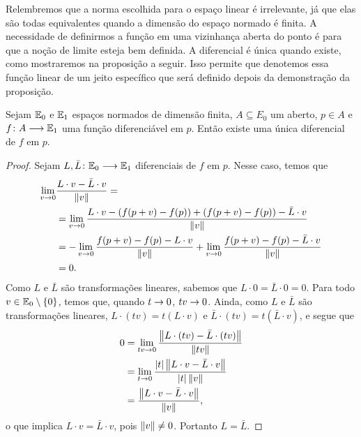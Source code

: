 
Relembremos que a norma escolhida para o espaço linear é irrelevante, já que elas são todas equivalentes quando a dimensão do espaço normado é finita. A necessidade de definirmos a função em uma vizinhança aberta do ponto é para que a noção de limite esteja bem definida. %
A diferencial é única quando existe, como mostraremos na proposição a seguir. Isso permite que denotemos essa função linear de um jeito específico que será definido depois da demonstração da proposição.

\begin{prop}
Sejam $\mathbb{E}_0$ e $\mathbb{E}_1$ espaços normados de dimensão finita, $A \subseteq E_0$ um aberto, $p \in A$ e $f\colon A \longrightarrow \mathbb{E}_1$ uma função diferenciável em $p$. Então existe uma única diferencial de $f$ em $p$.
\end{prop}
\begin{proof}
Sejam $L,\bar L\colon \mathbb{E}_0 \longrightarrow \mathbb{E}_1$ diferenciais de $f$ em $p$. Nesse caso, temos que
	\begin{align*}
	\lim_{v \rightarrow 0} &\frac{L \cdot v - \bar L \cdot v}{\left\Vert{v}\right\Vert} = \\
	&= \lim_{v \rightarrow 0} \frac{L \cdot v - (f(p+v)-f(p)) + (f(p+v)-f(p)) - \bar L \cdot v}{\left\Vert{v}\right\Vert} \\
	& =  -\lim_{v \rightarrow 0} \frac{f(p+v)-f(p) - L \cdot v}{\left\Vert{v}\right\Vert} + \lim_{v \rightarrow 0} \frac{f(p+v)-f(p) - \bar L \cdot v}{\left\Vert{v}\right\Vert} \\
	&=0.
	\end{align*}
Como $L$ e $\bar L$ são transformações lineares, sabemos que $L \cdot 0 = \bar L \cdot 0=0$. Para todo $v \in \mathbb{E}_0 \setminus \{0\}$, temos que, quando $t \rightarrow 0$, $tv \rightarrow 0$. Ainda, como $L$ e $\bar L$ são transformações lineares, $L \cdot (tv) = t(L \cdot v)$ e $\bar L \cdot (tv) = t (\bar L \cdot v)$, e segue que
	\begin{align*}
	0 &= \lim_{tv \rightarrow 0} \frac{\left\Vert{L \cdot (tv) - \bar L \cdot (tv)}\right\Vert}{\left\Vert{tv}\right\Vert} \\
		&= \lim_{t \rightarrow 0} \frac{\left\vert{t}\right\vert\left\Vert{L \cdot v - \bar L \cdot v}\right\Vert}{\left\vert{t}\right\vert \left\Vert{v}\right\Vert} \\
		&= \frac{\left\Vert{L \cdot v - \bar L \cdot v}\right\Vert}{\left\Vert{v}\right\Vert},
	\end{align*}
o que implica $L \cdot v = \bar L \cdot v$, pois $\left\Vert{v}\right\Vert \neq 0$. Portanto $L=\bar L$.
\end{proof}


